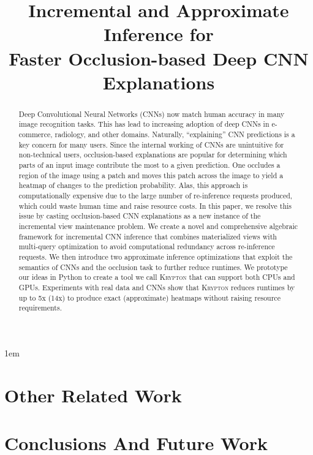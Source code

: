 \documentclass[10pt, sigconf]{acmart}
\begin{document}
\emergencystretch 1em

\title{Incremental and Approximate Inference for\\Faster Occlusion-based Deep CNN Explanations}



\begin{abstract}
Deep Convolutional Neural Networks (CNNs) now match human accuracy in many image recognition tasks. This has lead to increasing adoption of deep CNNs in e-commerce, radiology, and other domains. Naturally, ``explaining'' CNN predictions is a key concern for many users. Since the internal working of CNNs are unintuitive for non-technical users, occlusion-based explanations are popular for determining which parts of an input image contribute the most to a given prediction. One occludes a region of the image using a patch and moves this patch across the image to yield a heatmap of changes to the prediction probability. Alas, this approach is computationally expensive due to the large number of re-inference requests produced, which could waste human time and raise resource costs. In this paper, we resolve this issue by casting occlusion-based CNN explanations as a new instance of the incremental view maintenance problem. We create a novel and comprehensive algebraic framework for incremental CNN inference that combines materialized views with multi-query optimization to avoid computational redundancy across re-inference requests. We then introduce two approximate inference optimizations that exploit the semantics of CNNs and the occlusion task to further reduce runtimes. We prototype our ideas in Python to create a tool we call \textsc{Krypton} that can support both CPUs and GPUs. Experiments with real data and CNNs show that \textsc{Krypton} reduces runtimes by up to 5x (14x) to produce exact (approximate) heatmaps without raising resource requirements.
\end{abstract}

\maketitle











\section{Other Related Work}

\section{Conclusions And Future Work}





\end{document}
